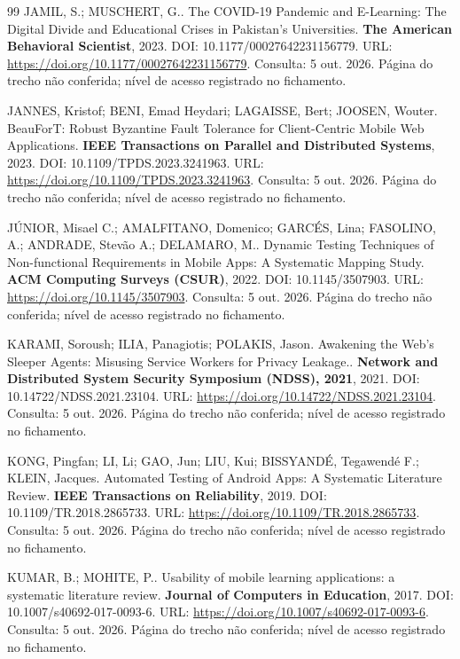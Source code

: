 \begin{thebibliography}{99}
 JAMIL, S.; MUSCHERT, G.. The COVID-19 Pandemic and E-Learning: The Digital Divide and Educational Crises in Pakistan’s Universities. \textbf{The American Behavioral Scientist}, 2023. DOI: 10.1177/00027642231156779. URL: \url{https://doi.org/10.1177/00027642231156779}. Consulta: 5 out. 2026. Página do trecho não conferida; nível de acesso registrado no fichamento.


 JANNES, Kristof; BENI, Emad Heydari; LAGAISSE, Bert; JOOSEN, Wouter. BeauForT: Robust Byzantine Fault Tolerance for Client-Centric Mobile Web Applications. \textbf{IEEE Transactions on Parallel and Distributed Systems}, 2023. DOI: 10.1109/TPDS.2023.3241963. URL: \url{https://doi.org/10.1109/TPDS.2023.3241963}. Consulta: 5 out. 2026. Página do trecho não conferida; nível de acesso registrado no fichamento.


 JÚNIOR, Misael C.; AMALFITANO, Domenico; GARCÉS, Lina; FASOLINO, A.; ANDRADE, Stevão A.; DELAMARO, M.. Dynamic Testing Techniques of Non-functional Requirements in Mobile Apps: A Systematic Mapping Study. \textbf{ACM Computing Surveys (CSUR)}, 2022. DOI: 10.1145/3507903. URL: \url{https://doi.org/10.1145/3507903}. Consulta: 5 out. 2026. Página do trecho não conferida; nível de acesso registrado no fichamento.


 KARAMI, Soroush; ILIA, Panagiotis; POLAKIS, Jason. Awakening the Web's Sleeper Agents: Misusing Service Workers for Privacy Leakage.. \textbf{Network and Distributed System Security Symposium (NDSS), 2021}, 2021. DOI: 10.14722/NDSS.2021.23104. URL: \url{https://doi.org/10.14722/NDSS.2021.23104}. Consulta: 5 out. 2026. Página do trecho não conferida; nível de acesso registrado no fichamento.


 KONG, Pingfan; LI, Li; GAO, Jun; LIU, Kui; BISSYANDÉ, Tegawendé F.; KLEIN, Jacques. Automated Testing of Android Apps: A Systematic Literature Review. \textbf{IEEE Transactions on Reliability}, 2019. DOI: 10.1109/TR.2018.2865733. URL: \url{https://doi.org/10.1109/TR.2018.2865733}. Consulta: 5 out. 2026. Página do trecho não conferida; nível de acesso registrado no fichamento.


 KUMAR, B.; MOHITE, P.. Usability of mobile learning applications: a systematic literature review. \textbf{Journal of Computers in Education}, 2017. DOI: 10.1007/s40692-017-0093-6. URL: \url{https://doi.org/10.1007/s40692-017-0093-6}. Consulta: 5 out. 2026. Página do trecho não conferida; nível de acesso registrado no fichamento.



\end{thebibliography}

